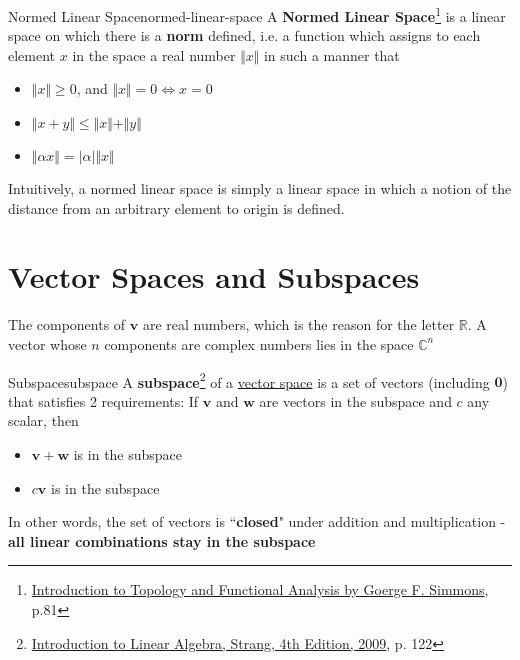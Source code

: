 \begin{Definition}{Normed Linear Space}{normed-linear-space}
    A \textbf{Normed Linear Space}\footnote{\href{https://trello.com/c/3EPccNTa}{Introduction to Topology and Functional Analysis by Goerge F. Simmons}, p.81}
    is a linear space on which there is a \textbf{norm} defined, i.e. a function which assigns to each element $x$ in
    the space a real number $\Vert x \Vert$ in such a manner that

    \begin{itemize}
        \item $\Vert x \Vert \ge 0$, and $\Vert x \Vert = 0 \iff x = 0$
        \item $\Vert x + y \Vert \le \Vert x \Vert + \Vert y \Vert$
        \item $\Vert \alpha x \Vert = \vert \alpha \vert \Vert x \Vert$
    \end{itemize}
\end{Definition}

Intuitively, a normed linear space is simply a linear space in which a notion of the distance from an arbitrary element
to origin is defined.

\section{Vector Spaces and Subspaces}


The components of $\boldsymbol{v}$ are real numbers, which is the reason for the letter $\mathbb{R}$. A vector whose $n$
components are complex numbers lies in the space $\mathbb{C}^n$

\begin{Definition}{Subspace}{subspace}
    A \textbf{subspace}\footnote{\href{https://trello.com/c/qHJeDNkU}{Introduction to Linear Algebra, Strang, 4th Edition, 2009}, p. 122}
    of a \hyperlink{vector-space}{vector space} is a set of vectors (including $\boldsymbol{0}$) that satisfies 2
    requirements: If $\boldsymbol{v}$ and $\boldsymbol{w}$ are vectors in the subspace and $c$ any scalar, then

    \begin{itemize}
        \item $\boldsymbol{v} + \boldsymbol{w}$ is in the subspace
        \item $c\boldsymbol{v}$ is in the subspace
    \end{itemize}

    In other words, the set of vectors is ``\textbf{closed}" under addition and multiplication - \textbf{all linear combinations
    stay in the subspace}

\end{Definition}

